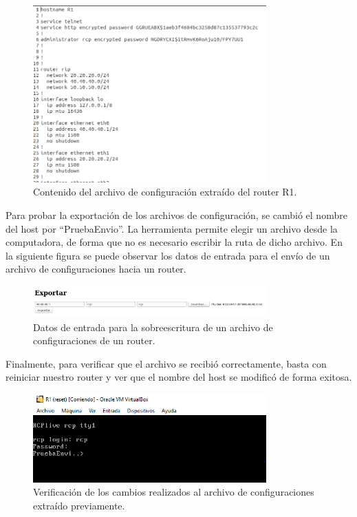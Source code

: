 \begin{figure}[htbp!]
	\centering
		\includegraphics[width=0.8\textwidth]{desarrollo/tarea3/imagenes/imagen8.png}
	\caption{Contenido del archivo de configuración extraído del router R1.}
\end{figure}

Para probar la exportación de los archivos de configuración, se cambió el nombre del host por “PruebaEnvio”. La herramienta permite elegir un archivo desde la computadora, de forma que no es necesario escribir la ruta de dicho archivo. En la siguiente figura se puede observar los datos de entrada para el envío de un archivo de configuraciones hacia un router.

\begin{figure}[htbp!]
	\centering
		\includegraphics[width=0.8\textwidth]{desarrollo/tarea3/imagenes/imagen9.png}
	\caption{Datos de entrada para la sobreescritura de un archivo de configuraciones de un router.}
\end{figure}

\pagebreak
Finalmente, para verificar que el archivo se recibió correctamente, basta con reiniciar nuestro router y ver que el nombre del host se modificó de forma exitosa.

\begin{figure}[htbp!]
	\centering
		\includegraphics[width=0.8\textwidth]{desarrollo/tarea3/imagenes/imagen10.png}
	\caption{Verificación de los cambios realizados al archivo de configuraciones extraído previamente.}
\end{figure}

